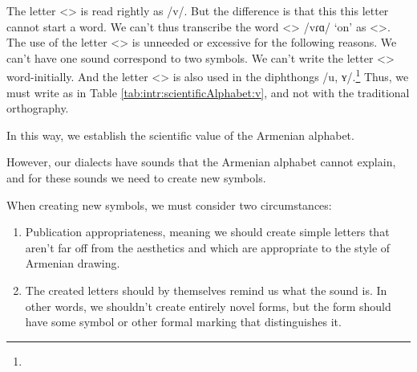 The letter <> is read rightly as /v/. But the difference is that this this letter cannot start a word. We can't thus transcribe the word <> /vɾɑ/ `on' as <>. The use of the letter <> is unneeded or excessive for the following reasons. We can't have one sound correspond to two symbols. We can't write the letter <> word-initially. And the letter <> is also used in the diphthongs  /u, ʏ/.\footnote{} Thus, we must write as in Table \ref{tab:intr:scientificAlphabet:v}, and not with the traditional orthography. 



\begin{table}[H]
	\centering
	\caption{Transcribing the letter <>}\label{tab:intr:scientificAlphabet:v}
	\end{table}




In this way, we establish the scientific value of the Armenian alphabet.

However, our dialects have sounds that the Armenian alphabet cannot explain, and for these sounds we need to create new symbols. 

When creating new symbols, we must consider two circumstances:
\begin{enumerate}
	\item Publication appropriateness, meaning we should create simple letters that aren't far off from the aesthetics and which are appropriate to the style of Armenian drawing. 
	\item The created letters should by themselves remind us what the sound is. In other words, we shouldn't create entirely novel forms, but the form should have some symbol or other formal marking that distinguishes it.
\end{enumerate}


